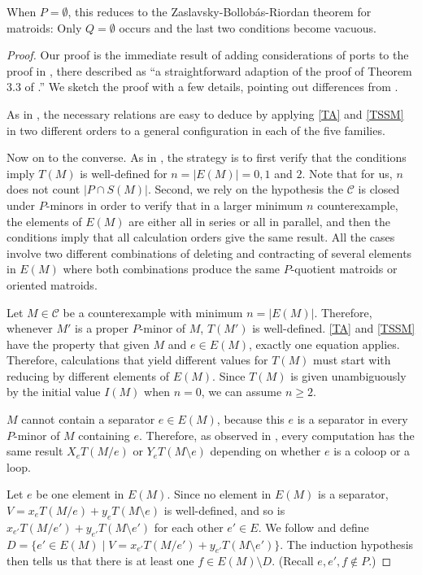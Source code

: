 \documentclass[12pt,leqno]{amsart}
\theoremstyle{remark}
\newcommand{\Card}[1]{\ensuremath{{\left|#1\right|}}}
\begin{document}
When $P=\emptyset$, this reduces to the
Zaslavsky-Bollob\'{a}s-Riordan theorem 
for matroids\cite{Ellis-Monaghan-Traldi}:
Only $Q=\emptyset$ occurs and the last two conditions become
vacuous.

\begin{proof}
Our proof is the immediate result of adding considerations of ports to the
proof in \cite{Ellis-Monaghan-Traldi}, there described
as ``a straightforward adaption of the proof of Theorem 3.3 of 
\cite{MR93a:05047}.''
We sketch the proof with a few details, pointing out differences from
\cite{Ellis-Monaghan-Traldi}.

As in \cite{Ellis-Monaghan-Traldi}, 
the necessary relations are easy to deduce by 
applying \eqref{TA} and \eqref{TSSM} in two different
orders to a general configuration in each of the five families.

Now on to the converse.
As in \cite{Ellis-Monaghan-Traldi}, the strategy
is to first verify
that the conditions imply $T(M)$ is well-defined for 
$n = \Card{E(M)} = 0, 1$ and $2$.  Note that
for us, $n$ does not count $|P\cap S(M)|$.
Second, we rely on the hypothesis the $\mathcal{C}$ is closed under
$P$-minors in order to verify
that in a larger minimum $n$ counterexample, the elements of
$E(M)$ are either all in series or all in parallel, 
and then the conditions
imply that all calculation orders give the same result.  All the cases involve
two different combinations of deleting and contracting of several elements
in $E(M)$ where both combinations produce the same $P$-quotient matroids
or oriented matroids.  

Let $M\in\mathcal{C}$ be a counterexample with minimum $n=|E(M)|$.
Therefore, whenever $M'$ is a proper $P$-minor of $M$,
$T(M')$ is well-defined.  \eqref{TA} and \eqref{TSSM}
have the property that given $M$ and $e\in E(M)$, exactly one equation
applies.  Therefore, 
calculations that yield different values for $T(M)$ must start with
reducing by different elements of $E(M)$.  Since $T(M)$ is given 
unambiguously by the initial value $I(M)$ when $n=0$, we can assume
$n\geq 2$.

$M$ cannot contain a separator $e\in E(M)$, because
this $e$ is a separator in every $P$-minor of $M$ containing $e$.
Therefore, as observed in \cite{Ellis-Monaghan-Traldi}, every
computation has the same result $X_e T(M/e)$ or $Y_e T(M\setminus e)$ 
depending on whether $e$ is a coloop or a loop.

Let $e$ be one element in $E(M)$.  Since no element in $E(M)$ is a 
separator, $V=x_{e} T(M/{e}) + y_{e} T(M\setminus {e})$ is well-defined, 
and so is $x_{e'} T(M/{e'}) + y_{e'} T(M\setminus {e'})$ 
for each other $e'\in E$.
We follow \cite{Ellis-Monaghan-Traldi} and define
$D=\{e'\in E(M) \mid V=x_{e'} T(M/{e'}) + y_{e'} T(M\setminus {e'})\}$.  The 
induction
hypothesis then tells us 
that there is at least 
one  $f\in E(M)\setminus D$.  
(Recall $e, e', f\not\in P$.)


\end{proof}
\end{document}
